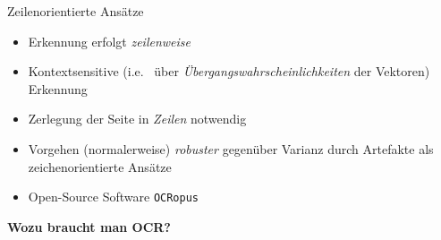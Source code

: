 \documentclass{bbawslides}
\begin{document}
\begin{bbawslide}{Zeilenorientierte Ansätze}
  \vspace*{7mm}%
  \centerslidestrue%
  \begin{minipage}{1.05\textwidth}
    \begin{itemize}
      \item Erkennung erfolgt \emph{zeilenweise}
    \end{itemize}
  \end{minipage}
  \begin{center}
  \end{center}
  \begin{minipage}{1.05\textwidth}
    \begin{itemize}
      \item Kontextsensitive (i.e.~ über \emph{Übergangswahrscheinlichkeiten} der Vektoren) Erkennung
      \item Zerlegung der Seite in \emph{Zeilen} notwendig
      \item Vorgehen (normalerweise) \emph{robuster} gegenüber Varianz durch Artefakte als zeichenorientierte Ansätze
      \item Open-Source Software \texttt{OCRopus} 
    \end{itemize}
  \end{minipage}
\end{bbawslide}

\begin{bbawpart}{\Large\bf Wozu braucht man OCR?}
\end{bbawpart}

\renewcommand{\footerText}{\tiny 4. August 2017, DH-Kolloquium, BBAW\hspace{4cm} Image by Achim Raschka, CC BY-SA 3.0}
\end{document}
